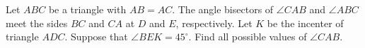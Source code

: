 Let $ABC$ be a triangle with $AB = AC$.
The angle bisectors of $\angle CAB$ and $\angle ABC$
meet the sides $BC$ and $CA$ at $D$ and $E$, respectively.
Let $K$ be the incenter of triangle $ADC$.
Suppose that $\angle BEK = 45^\circ$.
Find all possible values of $\angle CAB$.